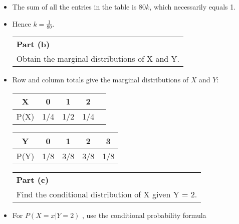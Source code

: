 \documentclass[a4paper,12pt]{article}
\begin{document}
	\begin{itemize}
		
		\item The sum of all the entries in the table is $80k$, which necessarily equals 1. 
		\item Hence 
		${ \displaystyle k = \frac{1}{80}}$.
		
		\newpage
		
		\begin{table}[ht!]
			\centering
			\begin{tabular}{|p{15cm}|}
				\hline  \large
				\noindent \textbf{Part (b)} \\ \large Obtain the marginal distributions of X and Y.
				\\ \hline
			\end{tabular}
		\end{table}
		\large
		
		
		
		\item  Row and column totals give the marginal distributions of $X$ and $Y$:
		
		\begin{center}
			\begin{tabular}{|c|c|c|c|c|} \hline
				X & 0 & 1 & 2\\ \hline
				P(X) & 1/4 & 1/2 & 1/4 \\ \hline
			\end{tabular}
		\end{center}
		
		\begin{center}
			\begin{tabular}{|c|c|c|c|c|} \hline
				Y & 0 & 1 & 2 & 3\\ \hline
				P(Y)&  1/8 & 3/8 & 3/8 & 1/8\\ \hline
			\end{tabular}
		\end{center}
		
		\newpage
		\begin{table}[ht!]
			\centering
			\begin{tabular}{|p{15cm}|}
				\hline  \large
				\noindent \textbf{Part (c)} \\ \large  Find the conditional distribution of X given Y = 2.
				\\ \hline
			\end{tabular}
		\end{table}
		\large 
		\item  For $P( X = x |Y = 2)$ , use the conditional probability formula
		

\end{itemize}
\end{document}
